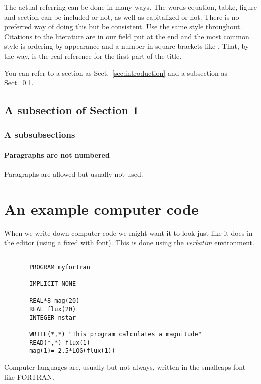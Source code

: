 \documentclass[a4paper,12pt]{article}
\begin{document}
The actual referring can be done in many ways. The words equation,
tabke, figure and section can be included or not, as well as capitalized
or not. There is no preferred way of doing this but be consistent.
Use the same style throughout.
Citations to the literature are in our field put at the end and the most common
style is ordering by appearance and a number in square brackets like
\cite{Kallen:1952zz}. That, by the way, is the real reference for the
first part of the title.

You can refer to a section as Sect.~\ref{sec:introduction}
and a subsection as Sect.~\ref{sec:asubsection}.


\subsection{A subsection of Section 1}
\label{sec:asubsection}

\subsubsection{A subsubsections}

\paragraph{Paragraphs are not numbered}

Paragraphs are allowed but usually not used.

\section{An example computer code}
\setcounter{equation}{0}

When we write down computer code we might
want it to look just like it does in the editor (using a fixed with font). This
is done using the {\sl verbatim} environment.

\begin{verbatim}

       PROGRAM myfortran

       IMPLICIT NONE

       REAL*8 mag(20)
       REAL flux(20)
       INTEGER nstar

       WRITE(*,*) "This program calculates a magnitude"
       READ(*,*) flux(1)
       mag(1)=-2.5*LOG(flux(1))

\end{verbatim}

Computer languages are, usually but not always, written in the smallcaps font
like {\sc FORTRAN}.
\end{document}
